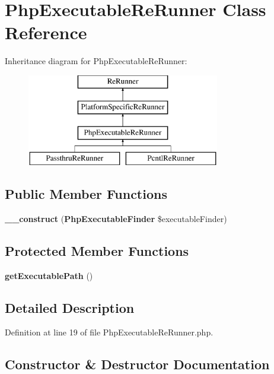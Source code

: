 \section{Php\+Executable\+Re\+Runner Class Reference}
\label{class_php_spec_1_1_process_1_1_re_runner_1_1_php_executable_re_runner}
Inheritance diagram for Php\+Executable\+Re\+Runner\+:\begin{figure}[H]
\begin{center}
\leavevmode
\includegraphics[height=4.000000cm]{class_php_spec_1_1_process_1_1_re_runner_1_1_php_executable_re_runner}
\end{center}
\end{figure}
\subsection*{Public Member Functions}
\begin{DoxyCompactItemize}
\item 
{\bf \+\_\+\+\_\+construct} ({\bf Php\+Executable\+Finder} \$executable\+Finder)
\end{DoxyCompactItemize}
\subsection*{Protected Member Functions}
\begin{DoxyCompactItemize}
\item 
{\bf get\+Executable\+Path} ()
\end{DoxyCompactItemize}


\subsection{Detailed Description}


Definition at line 19 of file Php\+Executable\+Re\+Runner.\+php.



\subsection{Constructor \& Destructor Documentation}
